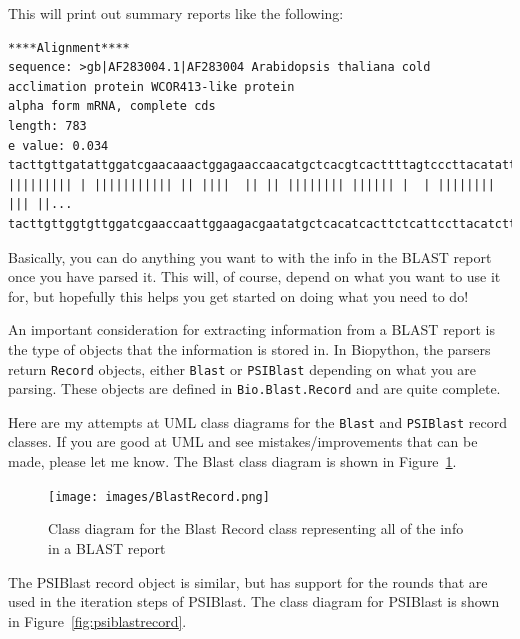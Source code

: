 \documentclass{report}
\begin{document}
This will print out summary reports like the following:

\begin{verbatim}
****Alignment****
sequence: >gb|AF283004.1|AF283004 Arabidopsis thaliana cold acclimation protein WCOR413-like protein
alpha form mRNA, complete cds
length: 783
e value: 0.034
tacttgttgatattggatcgaacaaactggagaaccaacatgctcacgtcacttttagtcccttacatattcctc...
||||||||| | ||||||||||| || ||||  || || |||||||| |||||| |  | |||||||| ||| ||...
tacttgttggtgttggatcgaaccaattggaagacgaatatgctcacatcacttctcattccttacatcttcttc...
\end{verbatim}

Basically, you can do anything you want to with the info in the BLAST
report once you have parsed it. This will, of course, depend on what
you want to use it for, but hopefully this helps you get started on
doing what you need to do!

An important consideration for extracting information from a BLAST report is the type of objects that the information is stored in. In Biopython, the parsers return \verb|Record| objects, either \verb|Blast| or \verb|PSIBlast| depending on what you are parsing. These objects are defined in \verb|Bio.Blast.Record| and are quite complete.

Here are my attempts at UML class diagrams for the \verb|Blast| and \verb|PSIBlast| record classes. If you are good at UML and see mistakes/improvements that can be made, please let me know. The Blast class diagram is shown in Figure~\ref{fig:blastrecord}.

\begin{htmlonly}
\label{fig:blastrecord}
\end{htmlonly}

\begin{latexonly}
\begin{figure}[htbp]
\centering
\texttt{[image: images/BlastRecord.png]}
\caption{Class diagram for the Blast Record class representing all of the info in a BLAST report}
\label{fig:blastrecord}
\end{figure}
\end{latexonly}

The PSIBlast record object is similar, but has support for the rounds that are used in the iteration steps of PSIBlast. The class diagram for PSIBlast is shown in Figure~\ref{fig:psiblastrecord}.

\begin{htmlonly}
\label{fig:psiblastrecord}
\end{htmlonly}
\end{document}
